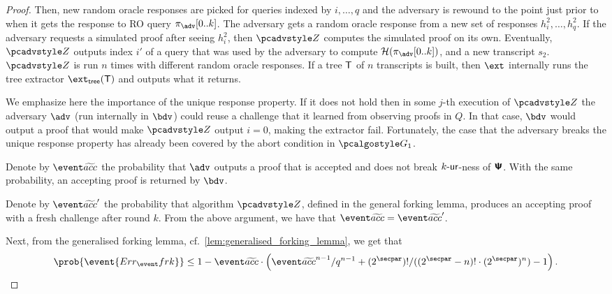 \begin{proof}
{		Then, new random oracle responses are picked for queries indexed by
		$i, \ldots, q$ and the adversary is rewound to the point just prior to when it gets the
		response to RO query $\zkproof_{\advse}[0..k]$. The adversary gets a random
		oracle response from a new set of responses $h^2_i, \ldots, h^2_q$. If the
		adversary requests a simulated proof after seeing $h^2_i$, then $\zdv$ computes
		the simulated proof on its own. Eventually, $\zdv$ outputs index $i'$ of a query
		that was used by the adversary to compute $\ro(\zkproof_{\advse}[0..k])$, and a
		new transcript $s_2$. $\zdv$ is run $n$ times with different random oracle
		responses. If a tree $\mathsf{T}$ of $n$ transcripts is built, then $\ext$
		internally runs the tree extractor $\extt(\tree)$ and outputs what it returns.
		
		We emphasize here the importance of the unique response property. If it does not hold then in
		some $j$-th execution of $\zdv$ the adversary $\adv$ (run internally in $\bdv$) could reuse a
		challenge that it learned from observing proofs in $Q$. In that case, $\bdv$ would output a
		proof that would make $\zdv$ output $i = 0$, making the extractor fail. Fortunately, the case
		that the adversary breaks the unique response property has already been covered by the abort
		condition in $\game{1}$.
		
		Denote by $\waccProb$ the probability that $\advse$ outputs a proof that is accepted and does
		not break ${k\text{-}\mathsf{ur}}$-ness of $\bm{\mathsf{\Psi}}$. With the same probability, an accepting proof is returned by
		$\bdv$.}

    Denote by $\waccProb'$ the probability that algorithm $\zdv$, defined in the general forking lemma,
		produces an accepting proof with a fresh challenge after round $k$. From the above argument,
		we have that $\waccProb = \waccProb'$.
		
		Next, from the generalised forking lemma, cf.~\cref{lem:generalised_forking_lemma}, we get that
		\begin{equation}
		\begin{split}
		\prob{\event{\errfrk}} \leq 1 - \waccProb \cdot \left(\infrac{\waccProb^{n -
				1}}{q^{n - 1}} + \infrac{(2^\secpar) !}{((2^\secpar - n)! \cdot
			(2^\secpar)^{n})} - 1\right).
		\end{split}
		\end{equation}
	
	

\end{proof}
